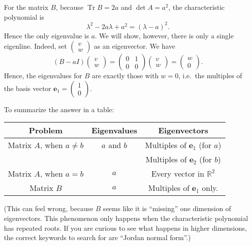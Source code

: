 \documentclass[addpoints, 12pt,answers]{exam}
\begin{document}
\begin{questions}
\begin{solution}
  For the matrix $B$, because $\operatorname{Tr} B = 2a$ and $\det A = a^2$,
  the characteristic polynomial is
  \[ \lambda^2 - 2a \lambda + a^2 = (\lambda-a)^2. \]
  Hence the only eigenvalue is $a$.
  We will show, however, there is only a single eigenline.
  Indeed, set $\begin{pmatrix} v \\ w \end{pmatrix}$ as an eigenvector.
  We have
  \[
    (B - aI) \begin{pmatrix} v \\ w \end{pmatrix}
    = \begin{pmatrix} 0 & 1 \\ 0 & 0 \end{pmatrix}
    \begin{pmatrix} v \\ w \end{pmatrix}
    = \begin{pmatrix} w \\ 0 \end{pmatrix}.
  \]
  Hence, the eigenvalues for $B$ are exactly those with $w = 0$,
  i.e.\ the multiples of the basis vector $\mathbf{e}_1 = \begin{pmatrix} 1 \\ 0 \end{pmatrix}$.

  To summarize the answer in a table:
  \begin{center}
    \begin{tabular}{ccc}
      Problem & Eigenvalues & Eigenvectors \\ \hline
      Matrix $A$, when $a \neq b$ & $a$ and $b$ & Multiples of $\mathbf{e}_1$ (for $a$) \\
      && Multiples of $\mathbf{e}_2$ (for $b$) \\
      Matrix $A$, when $a = b$ & $a$ & Every vector in $\mathbb{R}^2$ \\
      Matrix $B$ & $a$ & Multiples of $\mathbf{e}_1$ only.
    \end{tabular}
  \end{center}

  (This can feel wrong, because $B$ seems like it is ``missing''
  one dimension of eigenvectors.
  This phenomenon only happens when the characteristic polynomial has repeated roots.
  If you are curious to see what happens in higher dimensions,
  the correct keywords to search for are ``Jordan normal form''.)
\end{solution}

\end{questions}
\end{document}

